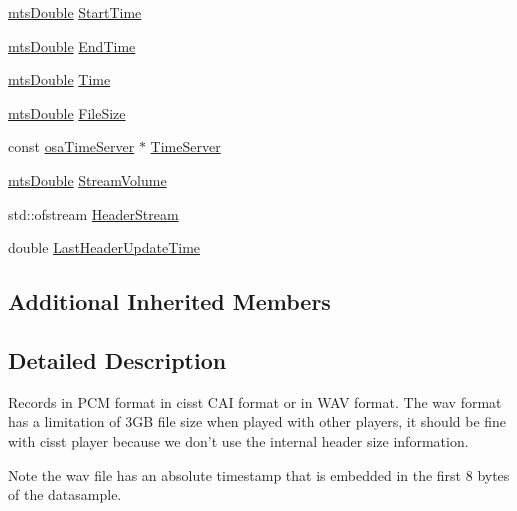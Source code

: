 \begin{DoxyCompactItemize}
\item 
\hyperlink{mts_generic_object_proxy_8h_a31e76b0190a8d3f9838626cd7b47bd75}{mts\-Double} \hyperlink{classmts_open_a_l_record_ab57135f4e6a6339382521b416e1ed914}{Start\-Time}
\item 
\hyperlink{mts_generic_object_proxy_8h_a31e76b0190a8d3f9838626cd7b47bd75}{mts\-Double} \hyperlink{classmts_open_a_l_record_a72313b9ec76ec2abd90ac514c1d2b515}{End\-Time}
\item 
\hyperlink{mts_generic_object_proxy_8h_a31e76b0190a8d3f9838626cd7b47bd75}{mts\-Double} \hyperlink{classmts_open_a_l_record_af6104f48da53ce5733a1a888520d38a1}{Time}
\item 
\hyperlink{mts_generic_object_proxy_8h_a31e76b0190a8d3f9838626cd7b47bd75}{mts\-Double} \hyperlink{classmts_open_a_l_record_a37028bf96b8e119b15db1b2edad8bd7c}{File\-Size}
\item 
const \hyperlink{classosa_time_server}{osa\-Time\-Server} $\ast$ \hyperlink{classmts_open_a_l_record_a91de11a3551290c23f912ebe998981ca}{Time\-Server}
\item 
\hyperlink{mts_generic_object_proxy_8h_a31e76b0190a8d3f9838626cd7b47bd75}{mts\-Double} \hyperlink{classmts_open_a_l_record_a36e814f3bb80ef27231bebaabca3f75d}{Stream\-Volume}
\item 
std\-::ofstream \hyperlink{classmts_open_a_l_record_a61c9f1c9a9e20ca8c2e6085c96dfc30f}{Header\-Stream}
\item 
double \hyperlink{classmts_open_a_l_record_a9c0c43fcbd4f722395a179a006a49714}{Last\-Header\-Update\-Time}
\end{DoxyCompactItemize}
\subsection*{Additional Inherited Members}


\subsection{Detailed Description}
Records in P\-C\-M format in cisst C\-A\-I format or in W\-A\-V format. The wav format has a limitation of 3\-G\-B file size when played with other players, it should be fine with cisst player because we don't use the internal header size information. \begin{DoxyNote}{Note}
the wav file has an absolute timestamp that is embedded in the first 8 bytes of the datasample. 
\end{DoxyNote}


